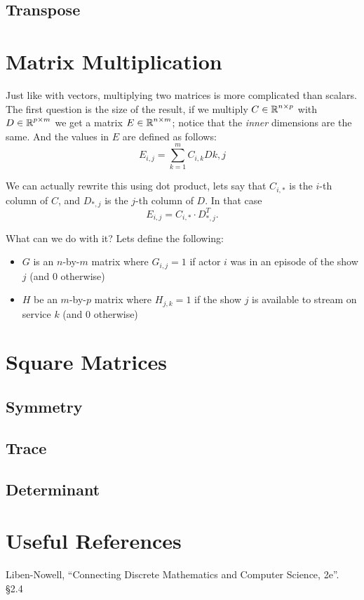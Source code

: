 \subsection{Transpose} 

\section{Matrix Multiplication}
Just like with vectors, multiplying two matrices is more complicated than scalars. 
The first question is the size of the result, if we multiply $C \in \operatorname{\mathbb{R}}^{n\times p}$ with $D \in \operatorname{\mathbb{R}}^{p\times m}$ we get a matrix $E \in \operatorname{\mathbb{R}}^{n\times m}$;
notice that the \textit{inner} dimensions are the same.
And the values in $E$ are defined as follows:
\[
E_{i,j} = \sum_{k=1}^m C_{i,k}D{k,j}
\]

We can actually rewrite this using dot product, lets say that $C_{i,*}$ is the $i$-th column of $C$, and $D_{*,j}$ is the $j$-th column of $D$.
In that case \[E_{i,j} = C_{i,*}\cdot D_{*,j}^T.\]

What can we do with it? Lets define the following:
\begin{itemize}
\item $G$ is an $n$-by-$m$ matrix where $G_{i,j}=1$ if actor $i$ was in an episode of the show $j$ (and $0$ otherwise)
\item $H$ be an $m$-by-$p$ matrix where $H_{j,k}=1$ if the show $j$ is available to stream on service $k$ (and $0$ otherwise) 
\end{itemize}


\section{Square Matrices}

\subsection{Symmetry}

\subsection{Trace}

\subsection{Determinant}



\section*{Useful References}
Liben-Nowell, ``Connecting Discrete Mathematics and Computer Science, 2e''. \S 2.4

